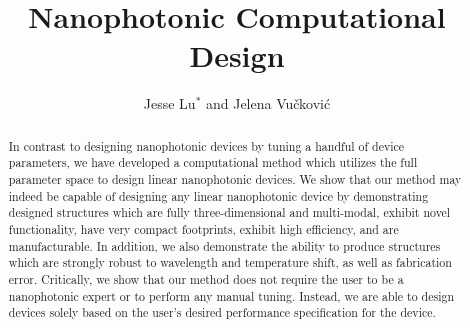 \documentclass[letterpaper,10pt]{article}
\begin{document}
\title{Nanophotonic Computational Design}
\author{Jesse Lu$^\ast$ and Jelena Vu\v{c}kovi\'{c}}
\address{Stanford University, Stanford, California, USA.}

\begin{abstract}
In contrast to designing nanophotonic devices 
    by tuning a handful of device parameters, 
    we have developed a computational method 
    which utilizes the full parameter space to design linear nanophotonic devices.
We show that our method may indeed be capable of designing 
    any linear nanophotonic device by demonstrating designed structures which
    are fully three-dimensional and multi-modal,
    exhibit novel functionality,
    have very compact footprints,
    exhibit high efficiency, and
    are manufacturable.
In addition, we also demonstrate the ability to produce structures
    which are strongly robust to wavelength and temperature shift,
    as well as fabrication error.
Critically, we show that our method 
    does not require the user to be a nanophotonic expert or 
    to perform any manual tuning. 
Instead, we are able to design devices 
    solely based on the user's desired performance specification for the device.
\end{abstract}
\end{document}
